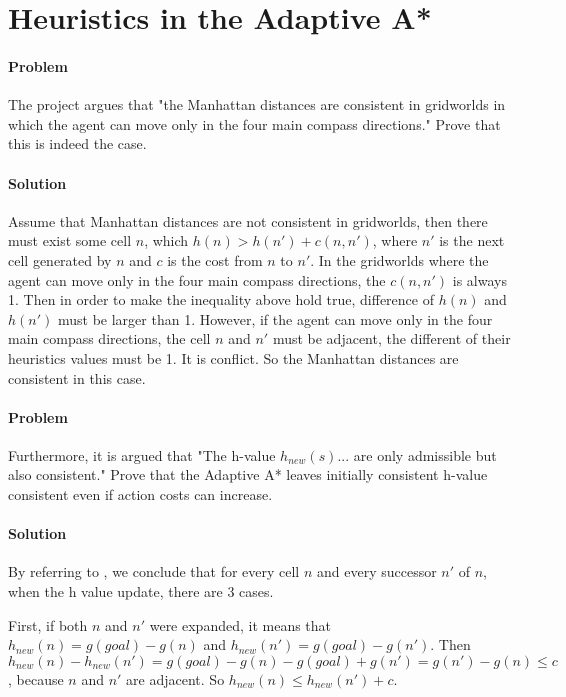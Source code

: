 \section{Heuristics in the Adaptive A*}

\paragraph{Problem}
The project argues that "the Manhattan distances are consistent in gridworlds
in which the agent can move only in the four main compass directions." Prove
that this is indeed the case.

\paragraph{Solution}
Assume that Manhattan distances are not consistent in gridworlds, then there
must exist some cell $n$, which $h(n) > h(n') + c(n,n')$, where $n'$ is the
next cell generated by $n$ and $c$ is the cost from $n$ to $n'$. In the
gridworlds where the agent can move only in the four main compass directions,
the $c(n,n')$ is always 1. Then in order to make the inequality above hold
true, difference of $h(n)$ and $h(n')$ must be larger than 1. However, if the
agent can move only in the four main compass directions, the cell $n$ and $n'$
must be adjacent, the different of their heuristics values must be 1. It is
conflict. So the Manhattan distances are consistent in this case.

\paragraph{Problem}
Furthermore, it is argued that "The h-value $h_{new}(s)$... are only admissible
but also consistent." Prove that the Adaptive A* leaves initially consistent
h-value consistent even if action costs can increase.

\paragraph{Solution}
By referring to \cite{koenig2006real}, we conclude that for every cell $n$ and
every successor $n'$ of $n$, when the h value update, there are 3 cases.

First, if both $n$ and $n'$ were expanded, it means that $h_{new}(n) = g(goal) -
g(n)$ and $h_{new}(n') = g(goal) - g(n')$. Then $h_{new}(n) - h_{new}(n') =
g(goal) - g(n) - g(goal) + g(n')=g(n') - g(n) \leq c$, because $n$ and $n'$ are
adjacent. So $h_{new}(n) \leq h_{new}(n') + c$. 

